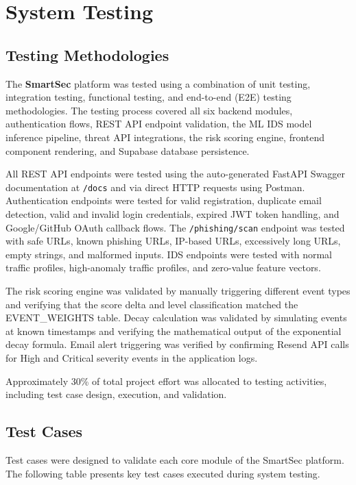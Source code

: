 \chapter{System Testing}

\section{Testing Methodologies}
The \textbf{SmartSec} platform was tested using a combination of unit testing, integration testing, functional testing, and end-to-end (E2E) testing methodologies. The testing process covered all six backend modules, authentication flows, REST API endpoint validation, the ML IDS model inference pipeline, threat API integrations, the risk scoring engine, frontend component rendering, and Supabase database persistence.

All REST API endpoints were tested using the auto-generated FastAPI Swagger documentation at \texttt{/docs} and via direct HTTP requests using Postman. Authentication endpoints were tested for valid registration, duplicate email detection, valid and invalid login credentials, expired JWT token handling, and Google/GitHub OAuth callback flows. The \texttt{/phishing/scan} endpoint was tested with safe URLs, known phishing URLs, IP-based URLs, excessively long URLs, empty strings, and malformed inputs. IDS endpoints were tested with normal traffic profiles, high-anomaly traffic profiles, and zero-value feature vectors.

The risk scoring engine was validated by manually triggering different event types and verifying that the score delta and level classification matched the EVENT\_WEIGHTS table. Decay calculation was validated by simulating events at known timestamps and verifying the mathematical output of the exponential decay formula. Email alert triggering was verified by confirming Resend API calls for High and Critical severity events in the application logs.

Approximately 30\% of total project effort was allocated to testing activities, including test case design, execution, and validation.


\section{Test Cases}
Test cases were designed to validate each core module of the SmartSec platform. The following table presents key test cases executed during system testing.

